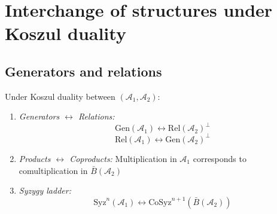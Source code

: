 \section{Interchange of structures under Koszul duality}

\subsection{Generators and relations}

\begin{theorem}\label{thm:structure-exchange}
Under Koszul duality between $(\mathcal{A}_1, \mathcal{A}_2)$:
\begin{enumerate}
\item \emph{Generators $\leftrightarrow$ Relations:}
\[\mathrm{Gen}(\mathcal{A}_1) \leftrightarrow \mathrm{Rel}(\mathcal{A}_2)^{\perp}\]
\[\mathrm{Rel}(\mathcal{A}_1) \leftrightarrow \mathrm{Gen}(\mathcal{A}_2)^{\perp}\]

\item \emph{Products $\leftrightarrow$ Coproducts:}
Multiplication in $\mathcal{A}_1$ corresponds to comultiplication in $\bar{B}(\mathcal{A}_2)$

\item \emph{Syzygy ladder:}
\[\mathrm{Syz}^n(\mathcal{A}_1) \leftrightarrow \mathrm{CoSyz}^{n+1}(\bar{B}(\mathcal{A}_2))\]
\end{enumerate}
\end{theorem}

